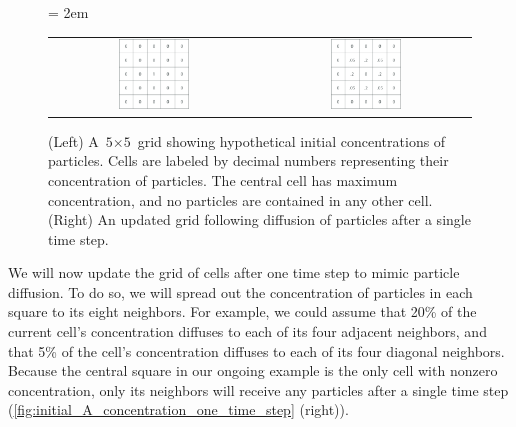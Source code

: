 \begin{figure}[h]
\centering
\mySfFamily
\tabcolsep = 2em
\begin{tabular}{c c}
\includegraphics[width = 0.35\textwidth]{../images_CMYK/initial_A_concentration} & \includegraphics[width = 0.35\textwidth]{../images_CMYK/A_concentration_one_time_step}
\end{tabular}
\caption{(Left) A $\text{5} \times \text{5}$ grid showing hypothetical initial concentrations of  particles. Cells are labeled by decimal numbers representing their concentration of  particles. The central cell has maximum concentration, and no particles are contained in any other cell. (Right) An updated grid following diffusion of particles after a single time step.}
\label{fig:initial_A_concentration_one_time_step}
\end{figure}

We will now update the grid of cells after one time step to mimic particle diffusion. To do so, we will spread out the concentration of particles in each square to its eight neighbors. For example, we could assume that 20\% of the current cell's concentration diffuses to each of its four adjacent neighbors, and that 5\% of the cell's concentration diffuses to each of its four diagonal neighbors. Because the central square in our ongoing example is the only cell with nonzero concentration, only its neighbors will receive any particles after a single time step (\autoref{fig:initial_A_concentration_one_time_step} (right)).\\

\begin{note}\end{note}

